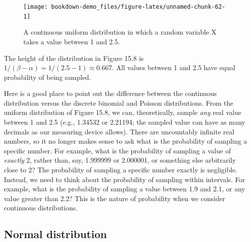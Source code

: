 \documentclass[
]{scrbook}
\begin{document}
\begin{figure}
\texttt{[image: bookdown-demo\_files/figure-latex/unnamed-chunk-62-1]} \caption{A continuous uniform distribution in which a random variable X takes a value between 1 and 2.5.}\label{fig:unnamed-chunk-62}
\end{figure}

The height of the distribution in Figure 15.8 is \(1/(\beta - \alpha) = 1/(2.5 - 1) \approx 0.667\).
All values between 1 and 2.5 have equal probability of being sampled.

Here is a good place to point out the difference between the continuous distribution versus the discrete binomial and Poisson distributions.
From the uniform distribution of Figure 15.8, we can, theoretically, sample \emph{any} real value between 1 and 2.5 (e.g., 1.34532 or 2.21194; the sampled value can have as many decimals as our measuring device allows).
There are uncountably infinite real numbers, so it no longer makes sense to ask what is the probability of sampling a specific number.
For example, what is the probability of sampling a value of \emph{exactly} 2, rather than, say, 1.999999 or 2.000001, or something else arbitrarily close to 2?
The probability of sampling a specific number exactly is negligible.
Instead, we need to think about the probability of sampling within intervals.
For example, what is the probability of sampling a value between 1.9 and 2.1, or any value greater than 2.2?
This is the nature of probability when we consider continuous distributions.

\hypertarget{normal-distribution}{%
\subsection{Normal distribution}\label{normal-distribution}}
\end{document}
